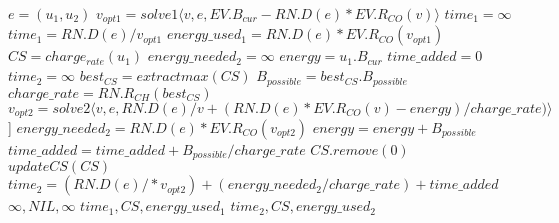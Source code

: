 \begin{algorithm}
 \begin{algorithmic}[1]
  	\State $e = (u_1, u_2)$
  	\State $v_{opt1} = solve1\langle v, e, EV.B_{cur}-RN.D(e)*EV.R_{CO}(v)\rangle$
  		\State $time_1 = \infty$
  	\Else
 		\State $time_1 = RN.D(e) / v_{opt1}$
 		\State $energy\_used_{1} = RN.D(e)*EV.R_{CO}(v_{opt1})$
  	\EndIf
		\State $CS = charge_{rate}(u_1)$ 
  		\State $energy\_needed_{2} = \infty$
  		\State $energy = u_1.B_{cur}$
  		\State $time\_added = 0$
  		\State $time_2 = \infty$
  		\State $best_{CS} = extractmax(CS)$
  		\State $B_{possible} = best_{CS}.B_{possible}$
  		\State $charge\_rate = RN.R_{CH}(best_{CS})$
  		\State $v_{opt2} = solve2 \langle v, e,  RN.D(e)/v + (RN.D(e) * EV.R_{CO}(v)-energy)/charge\_rate) \rangle$] 
  		\State $energy\_needed_{2} = RN.D(e)*EV.R_{CO}(v_{opt2})$
  		\State $energy = energy + B_{possible}$
  			\State $time\_added = time\_added + B_{possible}/charge\_rate$
  			\State $CS.remove(0)$
  			\State $updateCS(CS)$
  		\EndIf	
  	\EndWhile
  		\State $time_2 = (RN.D(e)/*v_{opt2}) + (energy\_needed_{2}/charge\_rate) + time\_added$
  	\EndIf
  		\State \Return $\infty, NIL, \infty$
  	\EndIf
  		\State \Return $time_1, CS, energy\_used_1$
  	\Else
  		\State \Return $time_2, CS, energy\_used_2$
  	\EndIf
  \EndFunction
  \end{algorithmic}\label{alg:fastest_path}
\end{algorithm}

